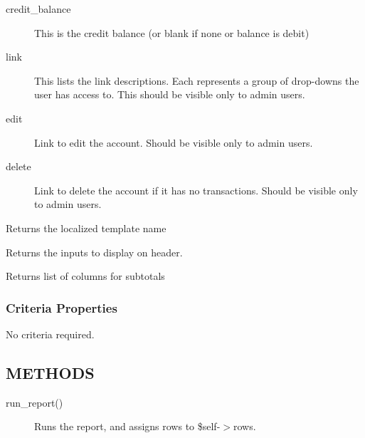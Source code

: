 \begin{description}
\begin{description}
\begin{description}
\begin{description}
\begin{description}
\begin{description}
\begin{description}
\begin{description}
\begin{description}
\begin{description}
\begin{description}
\begin{description}
\item[{credit\_balance}] \mbox{}

This is the credit balance (or blank if none or balance is debit)


\item[{link}] \mbox{}

This lists the link descriptions.  Each represents a group of drop-downs the
user has access to.  This should be visible only to admin users.


\item[{edit}] \mbox{}

Link to edit the account.  Should be visible only to admin users.


\item[{delete}] \mbox{}

Link to delete the account if it has no transactions.  Should be visible only to
admin users.

\end{description}

\item[{name}] \mbox{}

Returns the localized template name


\item[{header\_lines}] \mbox{}

Returns the inputs to display on header.


\item[{subtotal\_cols}] \mbox{}

Returns list of columns for subtotals

\end{description}
\subsubsection*{Criteria Properties\label{LedgerSMB::DBObject::Report::COA_Criteria_Properties}}


No criteria required.

\subsection*{METHODS\label{LedgerSMB::DBObject::Report::COA_METHODS}}
\begin{description}

\item[{run\_report()}] \mbox{}

Runs the report, and assigns rows to \$self-$>$rows.


\end{description}
\end{description}
\end{description}
\end{description}
\end{description}
\end{description}
\end{description}
\end{description}
\end{description}
\end{description}
\end{description}
